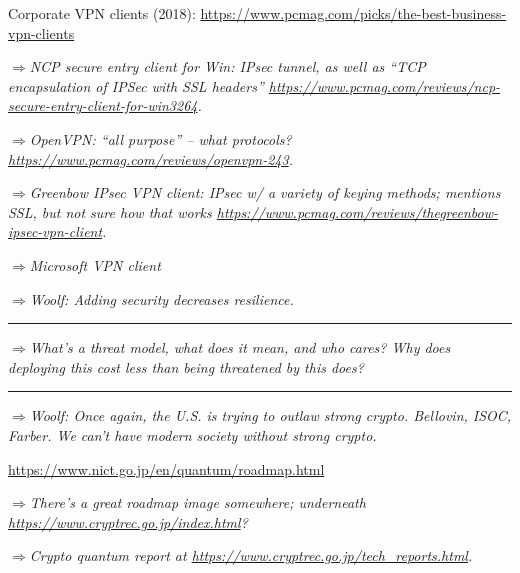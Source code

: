 \documentclass[%
 aip,
 jmp,%
 amsmath,amssymb,
 reprint,%
]{revtex4-1}
\def\outlinecomment#1{\hrule{\color{Blue}$\Rightarrow${\small\em #1}}\hrule}
\def\comment#1{{\color{ForestGreen}$\Rightarrow${\small\em #1}}}
\begin{document}
Corporate VPN clients (2018):
\url{https://www.pcmag.com/picks/the-best-business-vpn-clients}

\comment{NCP secure entry client for Win: IPsec tunnel, as well as
  ``TCP encapsulation of IPSec with SSL headers''
  \url{https://www.pcmag.com/reviews/ncp-secure-entry-client-for-win3264}.}

\comment{OpenVPN: ``all purpose'' -- what protocols? \url{https://www.pcmag.com/reviews/openvpn-243}.}

\comment{Greenbow IPsec VPN client: IPsec w/ a variety of keying
  methods; mentions SSL, but not sure how that works
  \url{https://www.pcmag.com/reviews/thegreenbow-ipsec-vpn-client}.}

\comment{Microsoft VPN client}

\comment{Woolf: Adding security decreases resilience.}

\outlinecomment{What's a threat model, what does it mean, and who
  cares?  Why does deploying this cost less than being threatened by
  this does?}

\comment{Woolf: Once again, the U.S. is trying to outlaw strong crypto.
  Bellovin, ISOC, Farber.  We can't have modern society without strong
crypto.}

\url{https://www.nict.go.jp/en/quantum/roadmap.html}

\comment{There's a great roadmap image somewhere; underneath \url{https://www.cryptrec.go.jp/index.html}?}

\comment{Crypto quantum report at \url{https://www.cryptrec.go.jp/tech_reports.html}.}
\end{document}

